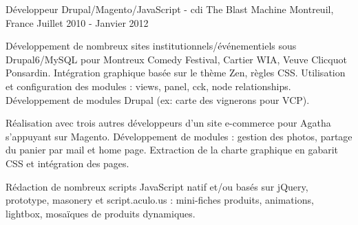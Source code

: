 \cventry
{Développeur Drupal/Magento/JavaScript - cdi} %
{The Blast Machine} %
{Montreuil, France} %
{Juillet 2010 - Janvier 2012} %
{
\begin{cvitems} %
    \item
    {
        Développement de nombreux sites institutionnels/événementiels sous Drupal6/MySQL pour
        Montreux Comedy Festival, Cartier WIA, Veuve Clicquot Ponsardin.
        Intégration graphique basée sur le thème Zen, règles CSS.
        Utilisation et configuration des modules : views, panel, cck, node relationships.
        Développement de modules Drupal (ex: carte des vignerons pour VCP).
    }
    \item
    {
        Réalisation avec trois autres développeurs d'un site e-commerce
        pour Agatha s'appuyant sur Magento.
        Développement de modules : gestion des photos, partage du panier par mail et home page.
        Extraction de la charte graphique en gabarit CSS et intégration des pages.
    }
    \item
    {
        Rédaction de nombreux scripts JavaScript natif et/ou basés sur jQuery, prototype,
        masonery et script.aculo.us : mini-fiches produits, animations, lightbox, mosaïques
        de produits dynamiques.
    }
\end{cvitems}
}
